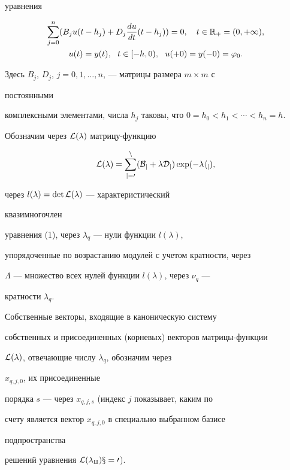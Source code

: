 уравнения


\begin{gather} 


\sum^n_{j=0}(B_j u(t-h_j)+D_j\frac{d u}{d t} 


(t-h_j))=0,\quad t\in\Bbb R_+=(0,+\infty), \\ 


u(t)=y(t),\ \ t\in[-h,0),\ \ u(+0)=y(-0)=\varphi_0. 


\end{gather} 


Здесь $B_j$, $D_j$, $j=0,1,\dotsc,n$, --- матрицы размера $m\times m$ с 


постоянными 


комплексными элементами, числа $h_j$ таковы, что $0=h_0<h_1<\dotsb<h_n=h$. 


 


Обозначим через $\cal L(\lambda)$ матрицу-функцию 


$$ 


\cal L(\lambda)=\sum^n_{j=0}(B_j+\lambda D_j)\exp(-\lambda h_j), 


$$ 


через $l(\lambda)=\det\cal L(\lambda)$ --- характеристический 


квазимногочлен 


\cite{1} уравнения (1), через $\lambda_q$ --- нули функции $l(\lambda)$, 


упорядоченные по возрастанию модулей с учетом кратности, через 


$\Lambda$ --- множество всех нулей функции $l(\lambda)$, через $\nu_q$ --- 


кратности $\lambda_q$. 


Собственные векторы, входящие в каноническую систему \cite{2} 


собственных и присоединенных (корневых) векторов матрицы-функ\-ции 


$\cal L(\lambda)$, отвечающие числу $\lambda_q$, обозначим через 


$x_{q,j,0}$, их присоединенные 


порядка $s$ --- через $x_{q,j,s}$ (индекс $j$ показывает, каким по 


счету является вектор $x_{q,j,0}$ в специально выбранном базисе 


подпространства 


решений уравнения $\cal L(\lambda_q)x=0$). 


 


